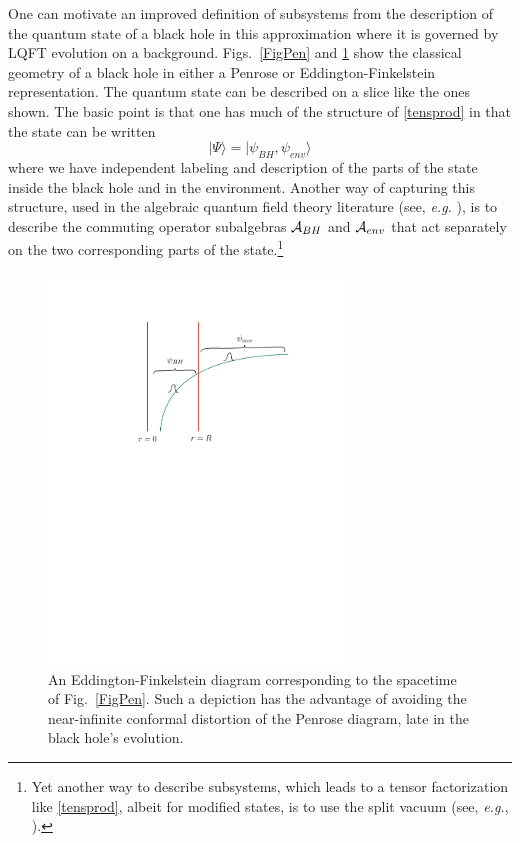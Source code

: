 \documentclass[11pt]{article}
\numberwithin{equation}{section}
\newcommand{\cala}{{\cal A}}
\newcommand{\beq}{\begin{equation}}
\newcommand{\eeq}{\end{equation}}
\begin{document}
One can motivate an improved definition of subsystems from the description of the quantum state of a black hole in this approximation where it is governed by LQFT evolution on a background.  Figs.~\ref{FigPen} and \ref{FigEF} show the classical geometry of a black hole in either a Penrose or Eddington-Finkelstein representation.  The quantum state can be described on a slice like the ones shown.  The basic point is that one has much of the structure of \eqref{tensprod} in that the state can be written
\beq\label{psitot}
|\Psi\rangle = |\psi_{BH},\psi_{env}\rangle
\eeq
where we have independent labeling and description of the parts of the state inside the black hole and in the environment.  Another way of capturing this structure, used in the algebraic quantum field theory literature (see, {\it e.g.} \cite{Haag}), is to describe the commuting operator subalgebras $\cala_{BH}$ and $\cala_{env}$ that act separately on the two corresponding parts of the state.\footnote{Yet another way to describe subsystems, which leads to a tensor factorization like \eqref{tensprod}, albeit for modified states, is to use the split vacuum (see, {\it e.g.}, \cite{Haag}).}


\begin{figure}[!hbtp] \begin{center}
\includegraphics[width=8cm]{Fig-EFS.pdf}
\end{center}
\caption{An Eddington-Finkelstein diagram corresponding to the spacetime of Fig.~\ref{FigPen}.  Such a depiction has the advantage of avoiding the near-infinite conformal distortion of the Penrose diagram, late in the black hole's evolution.}
\label{FigEF}
\end{figure} 
\end{document}
